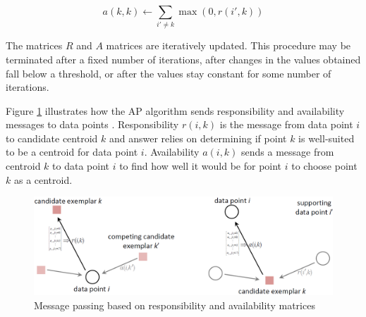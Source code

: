 \begin{itemize}
    \begin{equation}
        a(k, k) \leftarrow \sum\limits_{i' \neq k}\max(0, r(i', k))
    \end{equation}
  
  The matrices $R$ and $A$ matrices are iteratively updated. This procedure may be terminated after a fixed number of iterations, after changes in the values obtained fall below a threshold, or after the values stay constant for some number of iterations.
  
  
  

  Figure \ref{abc} illustrates how the AP algorithm sends responsibility and availability messages to data points \protect\cite{dueck2009affinity}. Responsibility $r(i,k)$ is the message from data point $i$ to candidate centroid $k$ and answer relies on determining if point $k$ is well-suited to be a centroid for data point $i$. Availability $a(i,k)$ sends a message from centroid $k$ to data point $i$ to find how well it would be for point $i$ to choose point $k$ as a centroid. 
    


    \begin{figure}
    \centering
    \includegraphics[width = 13 cm]{image/Chapters/Chapter2/APmessage.PNG}
    \caption{Message passing based on responsibility and availability matrices}
    \label{abc}
    \end{figure}



\end{itemize}
